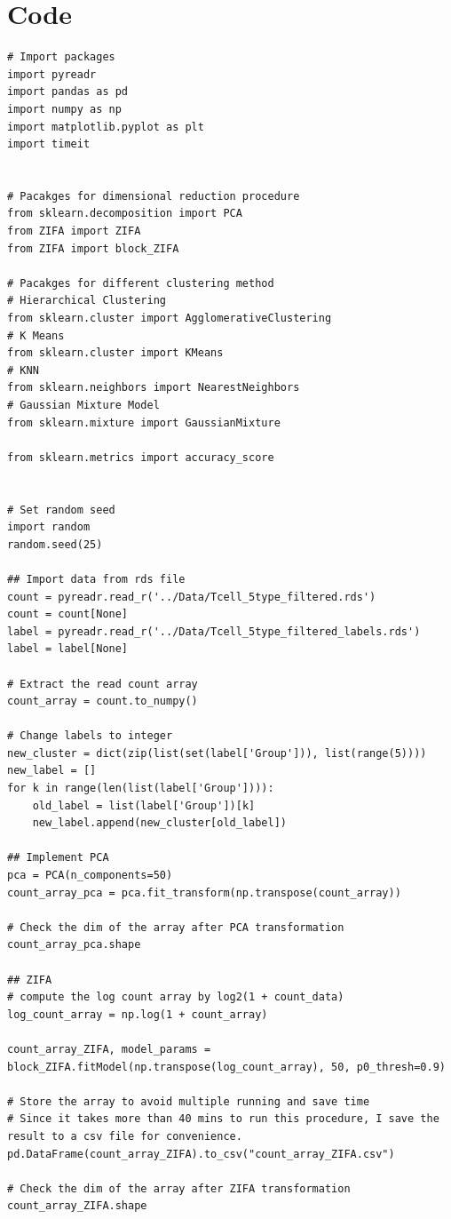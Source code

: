\documentclass[12pt]{article}
\theoremstyle{definition}
\begin{document}
\section*{Code}
\begin{lstlisting}
# Import packages
import pyreadr
import pandas as pd
import numpy as np
import matplotlib.pyplot as plt
import timeit


# Pacakges for dimensional reduction procedure
from sklearn.decomposition import PCA
from ZIFA import ZIFA
from ZIFA import block_ZIFA

# Pacakges for different clustering method
# Hierarchical Clustering
from sklearn.cluster import AgglomerativeClustering
# K Means
from sklearn.cluster import KMeans
# KNN
from sklearn.neighbors import NearestNeighbors
# Gaussian Mixture Model
from sklearn.mixture import GaussianMixture

from sklearn.metrics import accuracy_score


# Set random seed
import random
random.seed(25)

## Import data from rds file
count = pyreadr.read_r('../Data/Tcell_5type_filtered.rds')
count = count[None]
label = pyreadr.read_r('../Data/Tcell_5type_filtered_labels.rds')
label = label[None]

# Extract the read count array
count_array = count.to_numpy()

# Change labels to integer
new_cluster = dict(zip(list(set(label['Group'])), list(range(5))))
new_label = []
for k in range(len(list(label['Group']))):
    old_label = list(label['Group'])[k]
    new_label.append(new_cluster[old_label])
    
## Implement PCA
pca = PCA(n_components=50)
count_array_pca = pca.fit_transform(np.transpose(count_array))

# Check the dim of the array after PCA transformation
count_array_pca.shape

## ZIFA
# compute the log count array by log2(1 + count_data)
log_count_array = np.log(1 + count_array)

count_array_ZIFA, model_params = block_ZIFA.fitModel(np.transpose(log_count_array), 50, p0_thresh=0.9)

# Store the array to avoid multiple running and save time
# Since it takes more than 40 mins to run this procedure, I save the result to a csv file for convenience.
pd.DataFrame(count_array_ZIFA).to_csv("count_array_ZIFA.csv")

# Check the dim of the array after ZIFA transformation
count_array_ZIFA.shape



\end{lstlisting}
\end{document}

